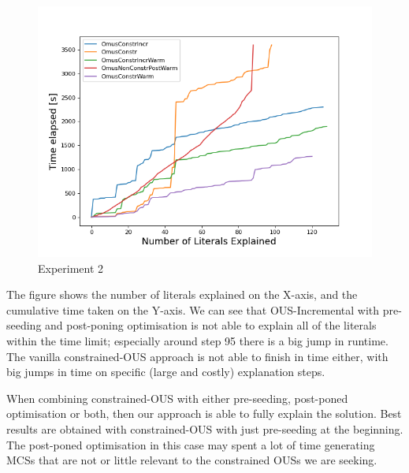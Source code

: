 \begin{figure}[t]
    \centering
    \includegraphics[width=\columnwidth]{figures/omusConstrCumulative.png}
    \caption{Experiment 2}
    \label{fig:exp2}
\end{figure}

The figure shows the number of literals explained on the X-axis, and the cumulative time taken on the Y-axis. 
We can see that OUS-Incremental with pre-seeding and post-poning optimisation is not able to explain all of the literals within the time limit; especially around step 95 there is a big jump in runtime. The vanilla constrained-OUS approach is not able to finish in time either, with big jumps in time on specific (large and costly) explanation steps.

When combining constrained-OUS with either pre-seeding, post-poned optimisation or both, then our approach is able to fully explain the solution. Best results are obtained with constrained-OUS with just pre-seeding at the beginning. The post-poned optimisation in this case may spent a lot of time generating MCSs that are not or little relevant to the constrained OUSs we are seeking.

